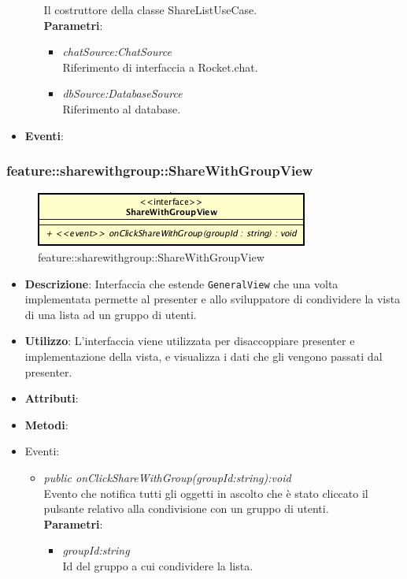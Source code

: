 \begin{itemize}
\begin{itemize}
	Il costruttore della classe ShareListUseCase.
	\\ \textbf{Parametri}: \begin{itemize}
	\item \textit{chatSource:ChatSource}\\
	 	Riferimento di interfaccia a Rocket.chat.
	\item \textit{dbSource:DatabaseSource}\\
		Riferimento al database.
	\end{itemize} 
\end{itemize}
\item \textbf{Eventi}:
\end{itemize}

\subsubsection{feature::sharewithgroup::ShareWithGroupView}

\label{feature::sharewithgroup::ShareWithGroupView}
\begin{figure}[ht]
	\centering
	\includegraphics[scale=0.5]{Sezioni/SottosezioniST/img/app/ShareWithGroupView.png}
	\caption{feature::sharewithgroup::ShareWithGroupView}
\end{figure}

\begin{itemize}
\item \textbf{Descrizione}: Interfaccia che estende \texttt{GeneralView} che una volta implementata permette al presenter e allo sviluppatore di condividere la vista di una lista ad un gruppo di utenti.
\item \textbf{Utilizzo}: L'interfaccia viene utilizzata per disaccoppiare presenter e implementazione della vista, e visualizza i dati che gli vengono passati dal presenter.
\item \textbf{Attributi}: 
\item \textbf{Metodi}:
\item{Eventi}:
	\begin{itemize}
	\item \textit{public onClickShareWithGroup(groupId:string):void}\\
	Evento che notifica tutti gli oggetti in ascolto che è stato cliccato il pulsante relativo alla condivisione con un gruppo di utenti.										
	\\ \textbf{Parametri}: \begin{itemize}
			\item \textit{groupId:string}\\
			Id del gruppo a cui condividere la lista.
			\end{itemize} 
	\end{itemize}
\end{itemize}

